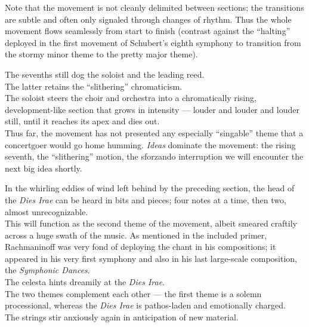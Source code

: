 \documentclass{beamer}
\begin{document}
\begin{frame}
  Note that the movement is not cleanly delimited between sections; the transitions are subtle and often only signaled through changes of rhythm. Thus the whole movement flows seamlessly from start to finish (contrast against the ``halting'' deployed in the first movement of Schubert's eighth symphony to transition from the stormy minor theme to the pretty major theme). 
\end{frame} 

\begin{frame}
  The sevenths still dog the soloist and the leading reed. 
  \pause \\ 
  The latter retains the ``slithering'' chromaticism. 
  \pause \\ 
  The soloist steers the choir and orchestra into a chromatically rising, development-like section that grows in intensity --- louder and louder and louder still, until it reaches its apex and dies out. 
  \pause \\ 
  Thus far, the movement has not presented any especially ``singable'' theme that a concertgoer would go home humming. \emph{Ideas} dominate the movement: the rising seventh, the ``slithering'' motion, the sforzando interruption \textellipsis we will encounter the next big idea shortly. 
\end{frame} 

\begin{frame}
  In the whirling eddies of wind left behind by the preceding section, the head of the \textit{Dies Irae} can be heard in bits and pieces; \pause four notes at a time, \pause then two, almost unrecognizable. 
  \pause \\
  This will function as the second theme of the movement, albeit smeared craftily across a huge swath of the music. As mentioned in the included primer, Rachmaninoff was very fond of deploying the chant in his compositions; it appeared in his very first symphony and also in his last large-scale composition, the \textit{Symphonic Dances}. 
  \pause \\ 
  The celesta hints dreamily at the \textit{Dies Irae}. 
  \pause \\ 
  The two themes complement each other --- the first theme is a solemn processional, whereas the \textit{Dies Irae} is pathos-laden and emotionally charged. 
  \pause \\ 
  The strings stir anxiously again in anticipation of new material. 
\end{frame} 
\end{document}
